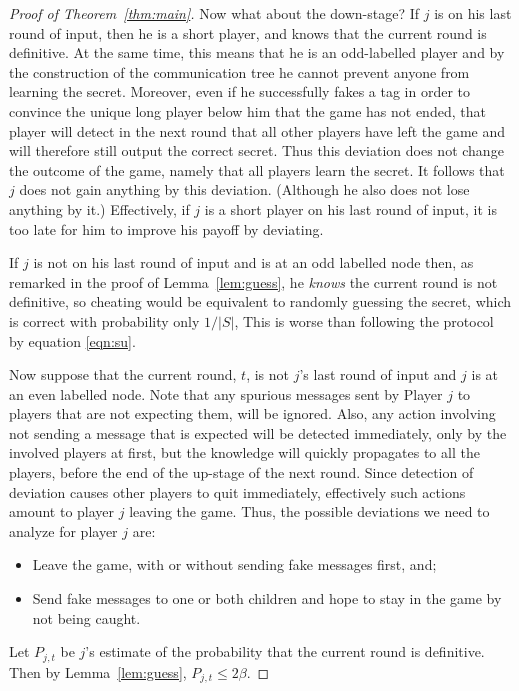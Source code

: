 \documentclass[12pt]{article}
\theoremstyle{definition}
\newcommand{\Pjt}{P_{j,t}}
\begin{document}
\begin{proof}[Proof of Theorem~\ref{thm:main}]
Now what about the down-stage? If $j$ is on his last round of input, then he 
is a short player, and knows that the current round is definitive. At the same 
time, this means that he is an odd-labelled player and by the construction 
of the communication tree he cannot prevent anyone from learning the secret. 
Moreover, even if he successfully fakes a tag in order to convince the unique
long player below him that the game has not ended, that player will detect 
in the next round that all other players have left the game and will 
therefore still output the correct secret. Thus this deviation does not 
change the outcome of the game, namely that all players learn the secret. 
It follows that $j$ does not gain anything 
by this deviation. (Although he also does not lose anything by it.) 
Effectively, if $j$ is a short player on his 
last round of input, it is too late for him to improve his payoff by deviating.


If $j$ is not on his last round of input and is at an odd labelled node then, 
as remarked in the proof of Lemma~\ref{lem:guess}, he \emph{knows} the current 
round is not definitive, so cheating would be equivalent to randomly guessing 
the secret, which is correct with probability only $1/|S|$, This is worse than following the protocol by equation \eqref{eqn:su}.

Now suppose that the current round, $t$, is not $j$'s last round of input 
and $j$ is at an even labelled node.  Note that any spurious messages sent by Player $j$ to players that are not expecting them, will be ignored.  Also, any action involving not sending a message that is expected will be 
detected immediately, only by the involved players at first, but the knowledge will quickly 
propagates to all the players, before the end of the up-stage of the next 
round. Since detection of deviation causes other players to quit immediately, 
effectively such actions amount to player $j$ leaving the game.  
Thus, the possible deviations we need to analyze for player $j$ are:
\begin{itemize}
\item Leave the game, with or without sending fake messages first, and;
\item Send fake messages to one or both children and hope to stay in the 
game by not being caught.
\end{itemize}

Let $\Pjt$
be $j$'s estimate of the probability that the current round is definitive. 
Then by Lemma~\ref{lem:guess},  $\Pjt \le 2\beta$. 


\end{proof}
\end{document}
